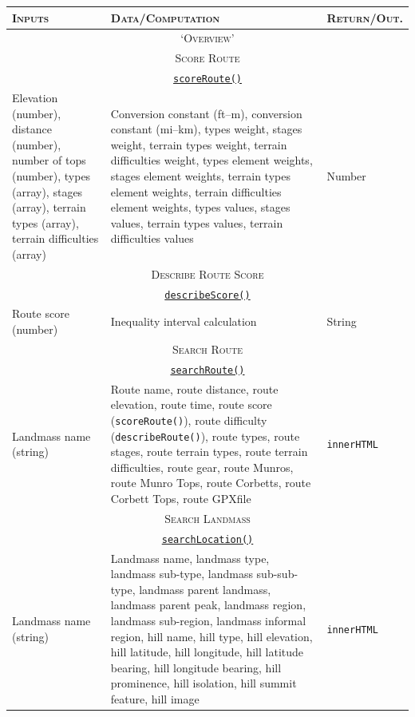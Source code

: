 \documentclass[11pt, english]{article}
\begin{document}
	\begin{center}
		\scriptsize
	\begin{longtable}{p{4cm}p{6cm}p{2cm}}
		\textsc{Inputs} & \textsc{Data/Computation} & \textsc{Return/Out.}\\
		\hline
		\hline
		\multicolumn{3}{c}{\textsc{`Overview'}}\\
		\hline \hline
		\multicolumn{3}{c}{\textsc{Score Route}}\\
		\hline
		\multicolumn{3}{c}{\underline{\texttt{scoreRoute()}}}\\
		Elevation (number), distance (number), number of tops (number), types (array), stages (array), terrain types (array), terrain difficulties (array) & Conversion constant (ft--m), conversion constant (mi--km), types weight, stages weight, terrain types weight, terrain difficulties weight, types element weights, stages element weights, terrain types element weights, terrain difficulties element weights, types values, stages values, terrain types values, terrain difficulties values & Number\\
		\hline
		\multicolumn{3}{c}{\textsc{Describe Route Score}}\\
		\hline
		\multicolumn{3}{c}{\underline{\texttt{describeScore()}}}\\
		Route score (number) & Inequality interval calculation & String\\
		\hline
		\multicolumn{3}{c}{\textsc{Search Route}}\\
		\hline
		\multicolumn{3}{c}{\underline{\texttt{searchRoute()}}}\\
		Landmass name (string) & Route name, route distance, route elevation, route time, route score (\texttt{scoreRoute()}), route difficulty (\texttt{describeRoute()}), route types, route stages, route terrain types, route terrain difficulties, route gear, route Munros, route Munro Tops, route Corbetts, route Corbett Tops, route GPXfile & \texttt{innerHTML}\\
		\hline
		\multicolumn{3}{c}{\textsc{Search Landmass}}\\
		\hline
		\multicolumn{3}{c}{\underline{\texttt{searchLocation()}}}\\
		Landmass name (string) & Landmass name, landmass type, landmass sub-type, landmass sub-sub-type, landmass parent landmass, landmass parent peak, landmass region, landmass sub-region, landmass informal region, hill name, hill type, hill elevation, hill latitude, hill longitude, hill latitude bearing, hill longitude bearing, hill prominence, hill isolation, hill summit feature, hill image & \texttt{innerHTML}\\

\end{longtable}
\end{center}
\end{document}
